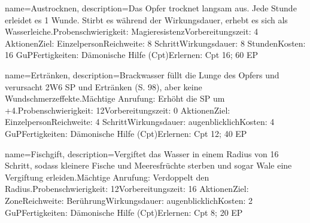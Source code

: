 {
    name={Austrocknen},
    description={Das Opfer trocknet langsam aus. Jede Stunde erleidet es 1 Wunde. Stirbt es während der Wirkungsdauer, erhebt es sich als Wasserleiche.\newline Probenschwierigkeit: Magieresistenz\newline Vorbereitungszeit: 4 Aktionen\newline Ziel: Einzelperson\newline Reichweite: 8 Schritt\newline Wirkungsdauer: 8 Stunden\newline Kosten: 16 GuP\newline Fertigkeiten: Dämonische Hilfe (Cpt)\newline Erlernen: Cpt 16; 60 EP}
}


{
    name={Ertränken},
    description={Brackwasser füllt die Lunge des Opfers und verursacht 2W6 SP und Ertränken (S. 98), aber keine Wundschmerzeffekte.\newline Mächtige Anrufung: Erhöht die SP um +4.\newline Probenschwierigkeit: 12\newline Vorbereitungszeit: 0 Aktionen\newline Ziel: Einzelperson\newline Reichweite: 4 Schritt\newline Wirkungsdauer: augenblicklich\newline Kosten: 4 GuP\newline Fertigkeiten: Dämonische Hilfe (Cpt)\newline Erlernen: Cpt 12; 40 EP}
}


{
    name={Fischgift},
    description={Vergiftet das Wasser in einem Radius von 16 Schritt, sodass kleinere Fische und Meeresfrüchte sterben und sogar Wale eine Vergiftung erleiden.\newline Mächtige Anrufung: Verdoppelt den Radius.\newline Probenschwierigkeit: 12\newline Vorbereitungszeit: 16 Aktionen\newline Ziel: Zone\newline Reichweite: Berührung\newline Wirkungsdauer: augenblicklich\newline Kosten: 2 GuP\newline Fertigkeiten: Dämonische Hilfe (Cpt)\newline Erlernen: Cpt 8; 20 EP}
}


